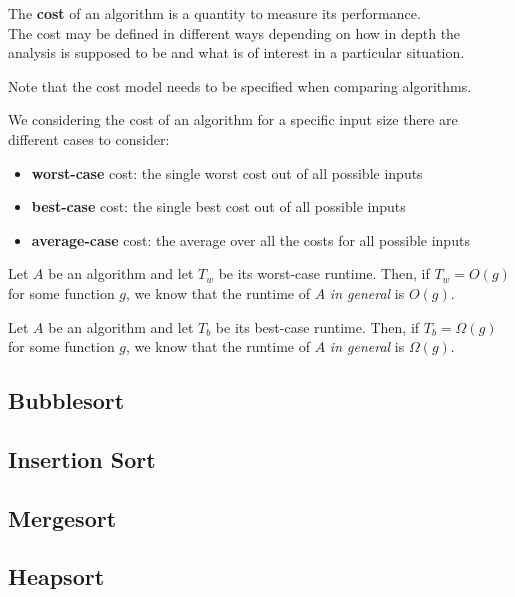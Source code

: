 \documentclass{article}
\begin{document}
\begin{definition}
	The \textbf{cost} of an algorithm is a quantity to measure its performance.\\
	The cost may be defined in different ways depending on
	how in depth the analysis is supposed to be and what
	is of interest in a particular situation.
\end{definition}
Note that the cost model needs to be specified when comparing algorithms.
\begin{definition}
	We considering the cost of an algorithm for a specific input size there are different cases to consider:
	\begin{itemize}
		\item \textbf{worst-case} cost: the single worst cost out of all possible inputs
		\item \textbf{best-case} cost: the single best cost out of all possible inputs
		\item \textbf{average-case} cost: the average over all the costs for all possible inputs
	\end{itemize}
\end{definition}
\begin{theorem}
	Let $A$ be an algorithm and let $T_w$ be its worst-case runtime. Then, if $T_w=O(g)$ for some function $g$,
	we know that the runtime of $A$ \emph{in general} is $O(g)$.
\end{theorem}
\begin{theorem}
	Let $A$ be an algorithm and let $T_b$ be its best-case runtime. Then, if $T_b=\Omega(g)$ for some function $g$,
	we know that the runtime of $A$ \emph{in general} is $\Omega (g)$.
\end{theorem}


\subsection{Bubblesort}


\subsection{Insertion Sort}


\subsection{Mergesort}


\subsection{Heapsort}
\end{document}

